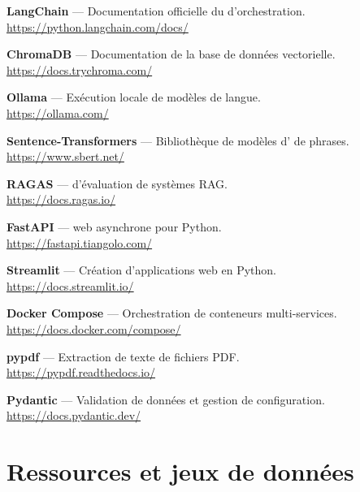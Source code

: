 \begin{enumerate}[label={[\arabic*]},leftmargin=2.2em,start=11]

\item \textbf{LangChain} --- Documentation officielle du 
d'orchestration. \\
\url{https://python.langchain.com/docs/}

\item \textbf{ChromaDB} --- Documentation de la base de données vectorielle. \\
\url{https://docs.trychroma.com/}

\item \textbf{Ollama} --- Exécution locale de modèles de langue. \\
\url{https://ollama.com/}

\item \textbf{Sentence-Transformers} --- Bibliothèque de modèles
d' de phrases. \\
\url{https://www.sbert.net/}

\item \textbf{RAGAS} ---  d'évaluation de systèmes RAG. \\
\url{https://docs.ragas.io/}

\item \textbf{FastAPI} ---  web asynchrone pour Python. \\
\url{https://fastapi.tiangolo.com/}

\item \textbf{Streamlit} --- Création d'applications web en Python. \\
\url{https://docs.streamlit.io/}

\item \textbf{Docker Compose} --- Orchestration de conteneurs multi-services. \\
\url{https://docs.docker.com/compose/}

\item \textbf{pypdf} --- Extraction de texte de fichiers PDF. \\
\url{https://pypdf.readthedocs.io/}

\item \textbf{Pydantic} --- Validation de données et gestion de configuration. \\
\url{https://docs.pydantic.dev/}

\end{enumerate}

\section*{Ressources et jeux de données}


